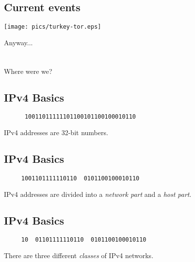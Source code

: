 \documentclass[xga]{xdvislides}
\begin{document}
\subsection{Current events}
\vspace*{\fill}
\begin{center}
	\texttt{[image: pics/turkey-tor.eps]} \\
\end{center}
\vspace*{\fill}

\newpage
\vspace*{\fill}
\begin{center}
    \Hugesize
        Anyway... \\ [1em]
    \hspace*{5mm}
    \blueline\\
    \hspace*{5mm}\\
	Where were we?
\end{center}
\vspace*{\fill}





\subsection{IPv4 Basics}
\vspace{.5in}
\Hugesize
\begin{center}
\begin{verbatim}
      10011011111101100101100100010110
\end{verbatim}
\vspace{.5in}
IPv4 addresses are 32-bit numbers.
\end{center}
\Normalsize

\subsection{IPv4 Basics}
\vspace{.5in}
\Hugesize
\begin{center}
\begin{verbatim}
     1001101111110110  0101100100010110
\end{verbatim}
\vspace{.5in}
IPv4 addresses are divided into a {\em network part} and a {\em host part}.
\end{center}
\Normalsize

\subsection{IPv4 Basics}
\vspace{.5in}
\Hugesize
\begin{center}
\begin{verbatim}
     10  01101111110110  0101100100010110
\end{verbatim}
\vspace{.5in}
There are three different {\em classes} of IPv4 networks.
\end{center}
\Normalsize
\end{document}
